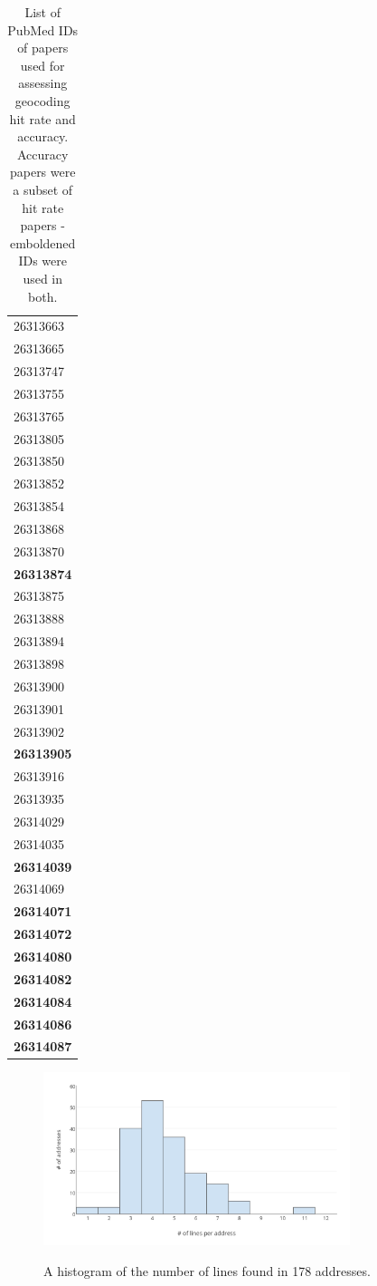 \documentclass[Report.tex]{subfiles}
\begin{document}
\begin{table}[ht!]
    \begin{tabular}{| l |}\hline
26313663\\
26313665\\
26313747\\
26313755\\
26313765\\
26313805\\
26313850\\
26313852\\
26313854\\
26313868\\
26313870\\
\textbf{26313874}\\
26313875\\
26313888\\
26313894\\
26313898\\
26313900\\
26313901\\
26313902\\
\textbf{26313905}\\
26313916\\
26313935\\
26314029\\
26314035\\
\textbf{26314039}\\
26314069\\
\textbf{26314071}\\
\textbf{26314072}\\
\textbf{26314080}\\
\textbf{26314082}\\
\textbf{26314084}\\
\textbf{26314086}\\
\textbf{26314087}\\ \hline
\end{tabular}
\caption{List of PubMed IDs of papers used for assessing geocoding hit rate and accuracy. Accuracy papers were a subset of hit rate papers - emboldened IDs were used in both.\label{tab:dataset}} 
\end{table}

\begin{figure}[!ht]
\begin{center}
	\includegraphics[width=0.8\textwidth]{../lib/images/address-lines-histogram}\\
	\caption{A histogram of the number of lines found in 178 addresses.\label{fig:addresslines}}
\end{center}
\end{figure}
\end{document}
